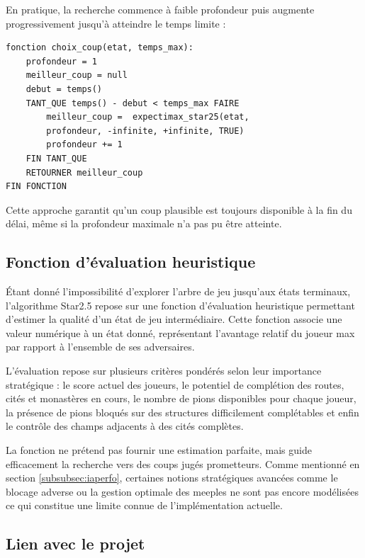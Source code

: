 \documentclass[11pt]{article}
\begin{document}
En pratique, la recherche commence à faible profondeur puis augmente progressivement jusqu'à atteindre le temps limite :
{\small
  \begin{verbatim}
fonction choix_coup(etat, temps_max):
    profondeur = 1
    meilleur_coup = null
    debut = temps()
    TANT_QUE temps() - debut < temps_max FAIRE
        meilleur_coup =  expectimax_star25(etat, 
        profondeur, -infinite, +infinite, TRUE)
        profondeur += 1
    FIN TANT_QUE
    RETOURNER meilleur_coup
FIN FONCTION
  \end{verbatim}
}

Cette approche garantit qu'un coup plausible est toujours disponible à la fin du délai, même si la profondeur maximale n'a pas pu être atteinte.




\subsection{Fonction d'évaluation heuristique}

Étant donné l'impossibilité d'explorer l'arbre de jeu jusqu'aux états 
terminaux, l'algorithme Star2.5 repose sur une fonction d'évaluation 
heuristique permettant d'estimer la qualité d'un état de jeu 
intermédiaire. Cette fonction associe une valeur numérique à un état 
donné, représentant l'avantage relatif du joueur max par rapport à 
l'ensemble de ses adversaires.

L'évaluation repose sur plusieurs critères pondérés selon leur 
importance stratégique : le score actuel des joueurs, le potentiel 
de complétion des routes, cités et monastères en cours, le nombre 
de pions disponibles pour chaque joueur, la présence de pions bloqués 
sur des structures difficilement complétables et enfin le contrôle 
des champs adjacents à des cités complètes.

La fonction ne prétend pas fournir une estimation parfaite, mais guide 
efficacement la recherche vers des coups jugés prometteurs. Comme 
mentionné en section \ref{subsubsec:iaperfo}, certaines notions 
stratégiques avancées comme le blocage adverse ou la gestion optimale 
des meeples ne sont pas encore modélisées ce qui constitue une 
limite connue de l'implémentation actuelle.

\subsection{Lien avec le projet}
\end{document}
